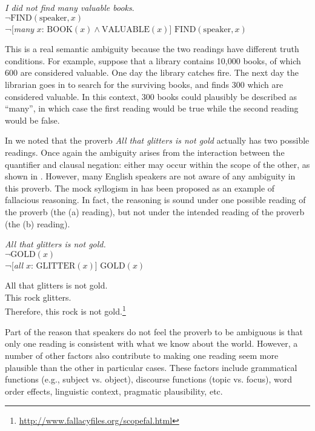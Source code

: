 {\ea \label{ex:14.31}
\textit{I did not find many valuable books}.\\
\ea {} $\neg \text{FIND}(\text{speaker},x)$\\
\ex  ¬[\textit{many} $x$: $\text{BOOK}(x) \wedge \text{VALUABLE}(x)$] $\text{FIND}(\text{speaker},x)$
   \z
\z


This is a real semantic ambiguity because the two readings have different truth conditions. For example, suppose that a library contains 10,000 books, of which 600 are considered valuable. One day the library catches fire. The next day the librarian goes in to search for the surviving books, and finds 300 which are considered valuable. In this context, 300 books could plausibly be described as “many”, in which case the first reading would be true while the second reading would be false.



In  we noted that the proverb \textit{All that glitters is not gold} actually has two possible readings. Once again the ambiguity arises from the interaction between the quantifier and clausal negation: either may occur within the scope of the other, as shown in . However, many English speakers are not aware of any ambiguity in this proverb. The mock syllogism in  has been proposed as an example of fallacious reasoning. In fact, the reasoning is sound under one possible reading of the proverb (the (a) reading), but not under the intended reading of the proverb (the (b) reading).


\ea \label{ex:14.32}
\textit{All that glitters is not gold.}\\
 $\neg\text{GOLD}(x)$\\
\ex  ¬[\textit{all} $x$: $\text{GLITTER}(x)$] $\text{GOLD}(x)$
                       \z
\z

\ea \label{ex:14.33}
All that glitters is not gold.\\
This rock glitters.\\
Therefore, this rock is not gold.\footnote{\url{http://www.fallacyfiles.org/scopefal.html}}
\z


Part of the reason that speakers do not feel the proverb to be ambiguous is that only one reading is consistent with what we know about the world. However, a number of other factors also contribute to making one reading seem more plausible than the other in particular cases. These factors include grammatical functions (e.g., subject vs. object), discourse functions (topic vs. focus), word order effects, linguistic context, pragmatic plausibility, etc.

}
